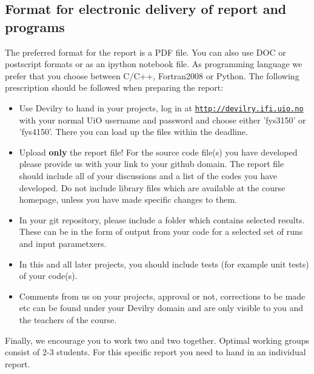\documentclass[%
oneside,                 %
final,                   %
10pt]{article}
\begin{document}
\noindent
\subsection*{Format for electronic delivery of report and programs}

The preferred format for the report is a PDF file. You can also use DOC or postscript formats or as an ipython notebook file.  As programming language we prefer that you choose between C/C++, Fortran2008 or Python. The following prescription should be followed when preparing the report:

\begin{itemize}
  \item Use Devilry to hand in your projects, log in  at  \href{{http://devilry.ifi.uio.no}}{\nolinkurl{http://devilry.ifi.uio.no}} with your normal UiO username and password and choose either 'fys3150' or 'fys4150'. There you can load up the files within the deadline.

  \item Upload \textbf{only} the report file!  For the source code file(s) you have developed please provide us with your link to your github domain.  The report file should include all of your discussions and a list of the codes you have developed.  Do not include library files which are available at the course homepage, unless you have made specific changes to them.

  \item In your git repository, please include a folder which contains selected results. These can be in the form of output from your code for a selected set of runs and input parametxers.

  \item In this and all later projects, you should include tests (for example unit tests) of your code(s).

  \item Comments  from us on your projects, approval or not, corrections to be made  etc can be found under your Devilry domain and are only visible to you and the teachers of the course.
\end{itemize}

\noindent
Finally, 
we encourage you to work two and two together. Optimal working groups consist of 
2-3 students. For this specific report you need to hand in an individual report.















\end{document}
